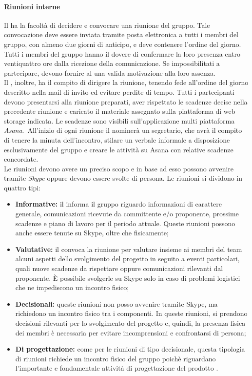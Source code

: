 			\paragraph{Riunioni interne}
			Il \textit{\RdP} ha la facoltà di decidere e convocare una riunione del gruppo. Tale convocazione deve essere inviata tramite posta elettronica a tutti i membri del gruppo, con almeno due giorni di anticipo, e deve contenere l'ordine del giorno.\\
			Tutti i membri del gruppo hanno il dovere di confermare la loro presenza entro ventiquattro ore dalla ricezione della comunicazione. Se impossibilitati a partecipare, devono fornire al \textit{\RdP} una valida motivazione alla loro assenza.\\
			Il \textit{\RdP}, inoltre, ha il compito di dirigere la riunione, tenendo fede all'ordine del giorno descritto nella mail di invito ed evitare perdite di tempo. Tutti i partecipanti devono presentarsi alla riunione preparati, aver rispettato le scadenze decise nella precedente riunione e caricato il materiale assegnato sulla piattaforma di web storage indicata. Le scadenze sono visibili sull'applicazione multi piattaforma \textit{Asana}.\
			All’inizio di ogni riunione il \textit{\RdP} nominerà un segretario, che avrà il compito di tenere la minuta dell'incontro, stilare un verbale informale a disposizione esclusivamente del gruppo e creare le attività su Asana con relative scadenze concordate.\\
			Le riunioni devono avere un preciso scopo e in base ad esso possono avvenire tramite \textit{Skype\ped{G}} oppure devono essere svolte di persona. Le riunioni si dividono in quattro tipi:
			\begin{itemize}
				\item \textbf{Informative:} il \textit{\RdP} informa il gruppo riguardo informazioni di carattere generale, comunicazioni ricevute da committente e/o proponente, prossime scadenze e piano di lavoro per il periodo attuale. Queste riunioni possono anche essere tenute su Skype, oltre che fisicamente;
				\item \textbf{Valutative:} il \textit{\RdP} convoca la riunione per valutare insieme ai membri del team alcuni aspetti dello svolgimento del progetto in seguito a eventi particolari, quali nuove scadenze da rispettare oppure comunicazioni rilevanti dal proponente. \MakeUppercase{è} possibile svolgerle su Skype solo in caso di problemi logistici che ne impediscono un incontro fisico;
				\item \textbf{Decisionali:} queste riunioni non posso avvenire tramite Skype, ma richiedono un incontro fisico tra i componenti. In queste riunioni, si prendono decisioni rilevanti per lo svolgimento del progetto e, quindi, la presenza fisica dei membri è necessaria per evitare incomprensioni e confrontarsi di persona;
				\item \textbf{Di progettazione:} come per le riunioni di tipo decisionale, questa tipologia di riunioni richiede un incontro fisico del gruppo poichè riguardano l'importante e fondamentale attività di progettazione del prodotto \progetto. 
			\end{itemize}
			
